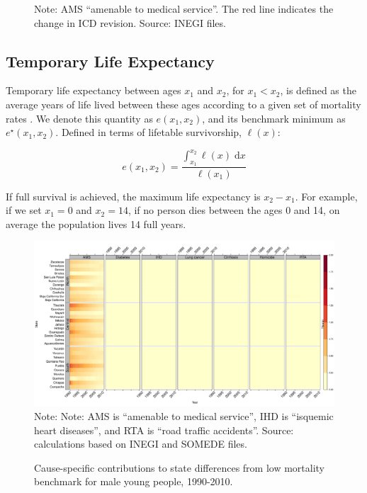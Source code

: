 \documentclass[11.5pt]{article}
\newcommand{\dd}{\; \mathrm{d}}
\begin{document}
{\begin{figure}
Note: AMS ``amenable to medical service''. The red line indicates the change in ICD revision. Source: INEGI files. 
\end{figure}



\subsection*{Temporary Life Expectancy}
Temporary life expectancy between ages
$x_1$ and $x_2$, for $x_1<x_2$, is defined as the average years of life lived between these ages according to a given set of mortality rates \citep{arriaga1984}. We denote this quantity as
$e(x_1,x_2)$, and its benchmark minimum as $e^{\star}(x_1,x_2)$. Defined in
terms of lifetable survivorship, $\ell(x)$:

\begin{equation}
e(x_1,x_2) = \frac{\int _{x_1}^{x_2} \ell(x) \dd x}{\ell(x_1)}
\end{equation}

If full survival is achieved, the maximum life expectancy is $x_2-x_1$.  For example, if we set $x_1=0$ and $x_2=14$, if no person dies between the ages 0 and 14, on average the population lives 14 full years.


\begin{figure}
\centering
\caption{Cause-specific contributions to state differences from low mortality benchmark for male young people, 1990-2010.}
\label{fig:e0_14_males}
\includegraphics[scale=.3]{Figures/Young_Male_heatmap.pdf}
Note: Note: AMS is ``amenable to medical service'', IHD is ``isquemic heart diseases'', and RTA is ``road traffic accidents''. Source: calculations based on INEGI and SOMEDE files. \end{figure}

}
\end{document}
